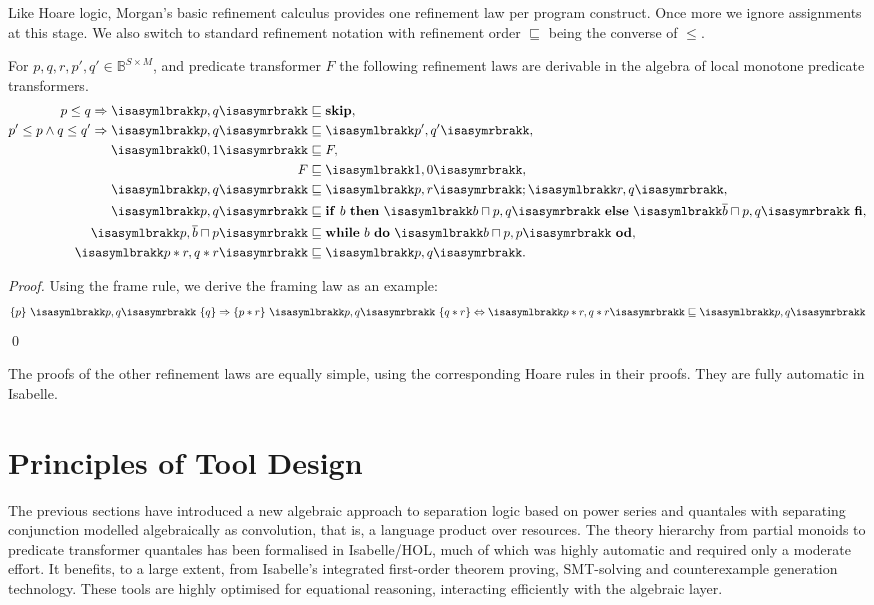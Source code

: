 \documentclass[twoside,runningheads,envcountsame,envcountsect,oribibl,orivec]{llncs}
\newcommand{\sskip}{\mathbf{skip}}
\newcommand{\iif}{\mathbf{if}}
\newcommand{\tthen}{\mathbf{then}}
\newcommand{\eelse}{\mathbf{else}}
\newcommand{\ffi}{\mathbf{fi}}
\newcommand{\wwhile}{\mathbf{while}}
\newcommand{\ddo}{\mathbf{do}}
\newcommand{\ood}{\mathbf{od}}
\newcommand{\triple}[3]{\{#1\}\ #2\ \{#3\}}
\newcommand{\ifstat}[3] {\iif \ #1 \ \tthen \ #2 \ \eelse \ #3 \ \ffi}
\newcommand{\whileloop}[2] {\wwhile \ #1 \ \ddo \ #2 \ \ood}
\newcommand{\spec}[2]{{\isasymlbrakk}#1, #2{\isasymrbrakk}}
\begin{document}
Like Hoare logic, Morgan's basic refinement calculus provides one
refinement law per program construct. Once more we ignore assignments
at this stage. We also switch to standard refinement notation with
refinement order $\sqsubseteq$ being the converse of $\le$. 

\begin{proposition}\label{P:morganderive}
  For $p,q,r,p',q'\in\mathbb{B}^{S\times M}$, and predicate
  transformer $F$ the following refinement laws are derivable in the
  algebra of local monotone predicate transformers.
\begin{align*}
	p \le q \Rightarrow \spec{p}{q} &\sqsubseteq \sskip, \\
	p' \le p \wedge q \le q' \Rightarrow \spec{p}{q} &\sqsubseteq \spec{p'}{q'}, \\
			\spec{0}{1} &\sqsubseteq F, \\
	F &\sqsubseteq \spec{1}{0}, \\
	\spec{p}{q} &\sqsubseteq \spec{p}{r}; \spec{r}{q}, \\
	\spec{p}{q} &\sqsubseteq \ifstat{b}{\spec{b\sqcap p}{q}}{\spec{\overline{b}\sqcap p}{q}}, \\
	\spec{p}{\overline{b}\sqcap p} &\sqsubseteq \whileloop{b}{\spec{b\sqcap p}{p}}, \\
	\spec{p \ast r}{q \ast r} &\sqsubseteq \spec{p}{q}. 
\end{align*}
\end{proposition}
\begin{proof} 
Using the frame rule, we derive the framing law as an example:
\begin{equation*}
	\triple{p}{\spec{p}{q}}{q} \Rightarrow \triple{p \ast r}{\spec{p}{q}}{q \ast r} 
		\Leftrightarrow \spec{p \ast r}{q \ast r} \sqsubseteq \spec{p}{q}
\end{equation*} 
\qed
\end{proof}
The proofs of the other refinement laws are equally simple, using the
corresponding Hoare rules in their proofs.  They are fully automatic
in Isabelle.



\section{Principles of Tool Design}\label{S:tool_design}

The previous sections have introduced a new algebraic approach to
separation logic based on power series and quantales with separating
conjunction modelled algebraically as convolution, that is, a language
product over resources. The theory hierarchy from partial monoids to
predicate transformer quantales has been formalised in Isabelle/HOL,
much of which was highly automatic and required only a moderate
effort. It benefits, to a large extent, from Isabelle's integrated
first-order theorem proving, SMT-solving and counterexample generation
technology.  These tools are highly optimised for equational
reasoning, interacting efficiently with the algebraic layer.
\end{document}

